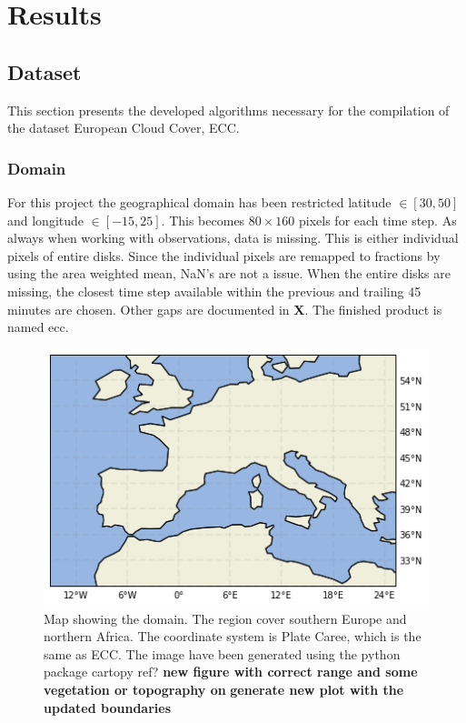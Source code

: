 \chapter{Results}

\section{Dataset}
This section presents the developed algorithms necessary for the compilation of the dataset European Cloud Cover, ECC. 

\subsection{Domain}
For this project the geographical domain has been restricted latitude $\in[30,50]$ and longitude $\in [-15, 25]$. This becomes $80\times160$ pixels for each time step. As always when working with observations, data is missing. This is either individual pixels of entire disks. Since the individual pixels are remapped to fractions by using the area weighted mean, NaN's are not a issue. When the entire disks are missing, the closest time step available within the previous and trailing 45 minutes are chosen. Other gaps are documented in \textbf{X}. The finished product is named \acrfull{ecc}.
\begin{figure}[h]
    \centering
    \includegraphics[scale = 0.7]{Chapter2_Theory/images/Domain.png}
    \caption{Map showing the domain. The region cover southern Europe and northern Africa. The coordinate system is Plate Caree, which is the same as ECC. The image have been generated using the python package cartopy ref? \textbf{new figure with correct range and some vegetation or topography on  } \textbf{generate new plot with the updated boundaries}}
    \label{fig:map}
\end{figure}


